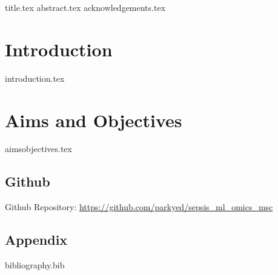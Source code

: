 \documentclass{book}
\begin{document}
\frontmatter
{}
%
{title.tex}
\clearpage
%
{abstract.tex}
\clearpage
%
{acknowledgements.tex}
\clearpage

\tableofcontents

\mainmatter

\chapter{Introduction}
{introduction.tex}

\chapter{Aims and Objectives}
{aimsobjectives.tex}

\backmatter

\newpage
\section{Github}
Github Repository: \url{https://github.com/parkyed/sepsis_ml_omics_msc}

\section{Appendix}


{bibliography.bib}
\end{document}
